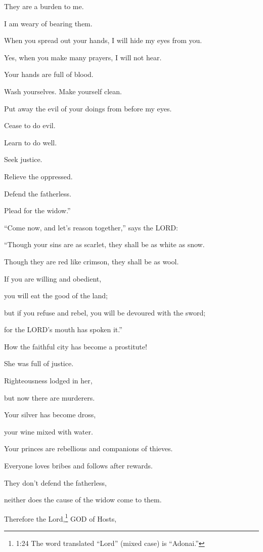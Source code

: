 They are a burden to me.

I am weary of bearing them.

\myverse{}When you spread out your hands, I will hide my eyes from you.

Yes, when you make many prayers, I will not hear.

Your hands are full of blood.

\myverse{}Wash yourselves. Make yourself clean.

Put away the evil of your doings from before my eyes.

Cease to do evil.

\myverse{}Learn to do well.

Seek justice.

Relieve the oppressed.

Defend the fatherless.

Plead for the widow.”


\vspace{\baselineskip} \myverse{}“Come now, and let’s reason together,” says the LORD:

“Though your sins are as scarlet, they shall be as white as snow.

Though they are red like crimson, they shall be as wool.

\myverse{}If you are willing and obedient,

you will eat the good of the land;

\myverse{}but if you refuse and rebel, you will be devoured
with the sword;

for the LORD’s mouth has spoken it.”


\vspace{\baselineskip} \myverse{}How the faithful city has become a prostitute!

She was full of justice.

Righteousness lodged in her,

but now there are murderers.

\myverse{}Your silver has become dross,

your wine mixed with water.

\myverse{}Your princes are rebellious and companions of thieves.

Everyone loves bribes and follows after rewards.

They don’t defend the fatherless,

neither does the cause of the widow come to them.


\vspace{\baselineskip} \myverse{}Therefore the Lord,\footnote{1:24 The word translated “Lord” (mixed case) is “Adonai.”
} GOD of Hosts,

